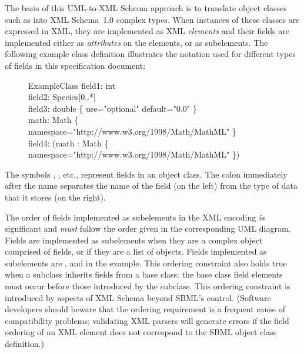 The basis of this UML-to-XML Schema approach is to translate
object classes such as \SBase into XML Schema~1.0 complex types.  When
instances of these classes are expressed in XML, they are
implemented as XML \emph{elements} and their fields are
implemented either as \emph{attributes} on the elements, or as
subelements.  The following example class definition illustrates
the notation used for different types of fields in this
specification document:

\begin{figure}[h]
  \centering
  \begin{classbox}{ExampleClass}
    field1: int                                                                \\
    field2: Species[0..*]                                                      \\
    field3: double \{ use="optional" default="0.0" \}                          \\
    math: Math \{ namespace="http://www.w3.org/1998/Math/MathML" \}            \\
    field4: (math : Math \{ namespace="http://www.w3.org/1998/Math/MathML" \}) \\
  \end{classbox}
\end{figure}

The symbols , , etc., represent
fields in an object class.  The colon immediately after the name
separates the name of the field (on the left) from the type of
data that it stores (on the right).

The order of fields implemented as subelements in the XML encoding
\emph{is} significant and \emph{must} follow the order given in
the corresponding UML diagram.  Fields are implemented as
subelements when they are a complex object comprised of
fields, or if they are a list of objects.  Fields implemented as
subelements are ,  and  in
the example. This ordering constraint also holds true when a
subclass inherits fields from a base class: the base class field
elements must occur before those introduced by the subclass.  This
ordering constraint is introduced by aspects of XML Schema beyond
SBML's control. (Software developers should beware that the
ordering requirement is a frequent cause of compatibility
problems; validating XML parsers will generate errors if the field
ordering of an XML element does not correspond to the SBML object
class definition.)

